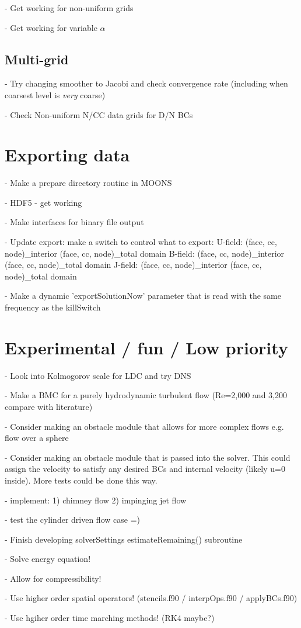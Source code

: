 \documentclass[11pt]{article}
\begin{document}
- Get working for non-uniform grids

- Get working for variable $\alpha$

\subsection{Multi-grid}
- Try changing smoother to Jacobi and check convergence rate (including when coarsest level is \textit{very} coarse)

- Check Non-uniform N/CC data grids for D/N BCs

\section{Exporting data}
- Make a prepare directory routine in MOONS

- HDF5 - get working

- Make interfaces for binary file output

- Update export: make a switch to control what to export:
      U-field: (face, cc, node)\_interior (face, cc, node)\_total domain
      B-field: (face, cc, node)\_interior (face, cc, node)\_total domain
      J-field: (face, cc, node)\_interior (face, cc, node)\_total domain

- Make a dynamic 'exportSolutionNow' parameter that is read
with the same frequency as the killSwitch



\section{Experimental / fun / Low priority}
- Look into Kolmogorov scale for LDC and try DNS

- Make a BMC for a purely hydrodynamic turbulent flow (Re=2,000 and 3,200 compare with literature)

- Consider making an obstacle module that allows for more complex flows
e.g. flow over a sphere

- Consider making an obstacle module that is passed into the solver.
This could assign the velocity to satisfy any desired BCs and internal
velocity (likely u=0 inside). More tests could be done this way.

- implement: 1) chimney flow 2) impinging jet flow

- test the cylinder driven flow case =)

- Finish developing solverSettings estimateRemaining() subroutine

- Solve energy equation!

- Allow for compressibility!

- Use higher order spatial operators! (stencils.f90 / interpOps.f90 / applyBCs.f90)

- Use hgiher order time marching methods! (RK4 maybe?)
\end{document}
